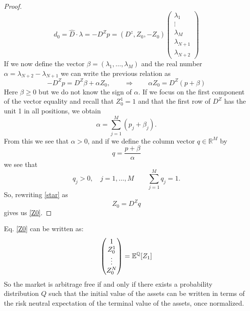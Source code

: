 \begin{proof}
\begin{equation*}
        d_0=\hat{D}\cdot\lambda = -D^Zp=(D^z, Z_0, -Z_0)\left(
        \begin{matrix}
            \lambda_1 \\ \vdots \\ \lambda_M \\ \lambda_{N+1} \\ \lambda_{N+2}
        \end{matrix}
        \right)
    \end{equation*}
    If we now define the vector $\beta = (\lambda_1,\dots,\lambda_M)$ and the real number $\alpha = \lambda_{N+2}-\lambda_{N+1}$ we can write the previous relation as
    \begin{equation}\label{star}
        -D^Zp = D^Z\beta + \alpha Z_0, \qquad\Rightarrow\qquad \alpha Z_0 = D^Z(p+\beta) \tag{$\star$}
    \end{equation}
    Here $\beta\ge0$ but we do not know the sign of $\alpha$. If we focus on the first component of the vector equality and recall that $Z^1_0 = 1$ and that the first row of $D^Z$ has the unit 1 in all positions, we obtain
    \begin{equation*}
        \alpha = \sum^M_{j=1}(p_j+\beta_j).
    \end{equation*}
    From this we see that $\alpha > 0$, and if we define the column vector $q\in\mathbb{R}^M$ by 
    \begin{equation*}
        q = \dfrac{p+\beta}{\alpha}
    \end{equation*}
    we see that
    \begin{equation*}
        q_j>0,\quad j=1,\dots,M \qquad \sum^M_{j=1}q_j=1.
    \end{equation*}
    So, rewriting \eqref{star} as 
    \begin{equation*}
        Z_0 = D^Zq
    \end{equation*}
    gives us \eqref{Z0}.
\end{proof}
Eq. \eqref{Z0} can be written as:
\begin{equation}
    \left(
    \begin{matrix}
        1 \\ Z_0^1 \\ \vdots \\ Z_0^N
    \end{matrix}
    \right) = \mathbb{E}^{\mathbb{Q}}[Z_1]
\end{equation}
So the market is arbitrage free if and only if there exists a probability distribution $Q$ such that the initial value of the assets can be written in terms of the risk neutral expectation of the terminal value of the assets, once normalized.\\
